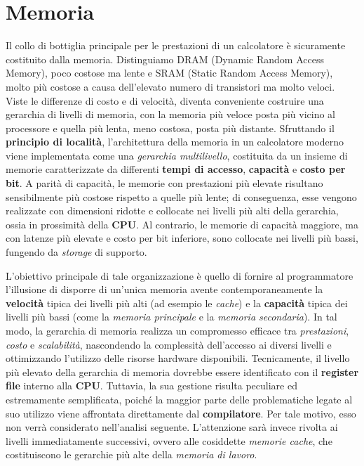 \sloppy \section{Memoria} \label{sec:richiami_memoria}
Il collo di bottiglia principale per le prestazioni di un calcolatore è sicuramente costituito dalla memoria. Distinguiamo DRAM (Dynamic Random  Access Memory), poco costose ma lente e SRAM (Static Random Access Memory), molto più costose a causa dell'elevato numero di transistori ma molto veloci. Viste le differenze di costo e di velocità, diventa conveniente costruire una gerarchia di livelli di memoria, con la memoria più veloce posta più vicino al processore e quella più lenta, meno costosa, posta più distante.
Sfruttando il \textbf{principio di località}, l’architettura della memoria in un calcolatore moderno viene implementata come una \textit{gerarchia multilivello}, costituita da un insieme di memorie caratterizzate da differenti \textbf{tempi di accesso}, \textbf{capacità} e \textbf{costo per bit}. A parità di capacità, le memorie con prestazioni più elevate risultano sensibilmente più costose rispetto a quelle più lente; di conseguenza, esse vengono realizzate con dimensioni ridotte e collocate nei livelli più alti della gerarchia, ossia in prossimità della \textbf{CPU}. Al contrario, le memorie di capacità maggiore, ma con latenze più elevate e costo per bit inferiore, sono collocate nei livelli più bassi, fungendo da \textit{storage} di supporto.  

L'obiettivo principale di tale organizzazione è quello di fornire al programmatore l'illusione di disporre di un’unica memoria avente contemporaneamente la \textbf{velocità} tipica dei livelli più alti (ad esempio le \textit{cache}) e la \textbf{capacità} tipica dei livelli più bassi (come la \textit{memoria principale} e la \textit{memoria secondaria}). In tal modo, la gerarchia di memoria realizza un compromesso efficace tra \textit{prestazioni}, \textit{costo} e \textit{scalabilità}, nascondendo la complessità dell’accesso ai diversi livelli e ottimizzando l’utilizzo delle risorse hardware disponibili.
Tecnicamente, il livello più elevato della gerarchia di memoria dovrebbe essere identificato con il \textbf{register file} interno alla \textbf{CPU}. Tuttavia, la sua gestione risulta peculiare ed estremamente semplificata, poiché la maggior parte delle problematiche legate al suo utilizzo viene affrontata direttamente dal \textbf{compilatore}. Per tale motivo, esso non verrà considerato nell'analisi seguente. L'attenzione sarà invece rivolta ai livelli immediatamente successivi, ovvero alle cosiddette \textit{memorie cache}, che costituiscono le gerarchie più alte della \textit{memoria di lavoro}.  

